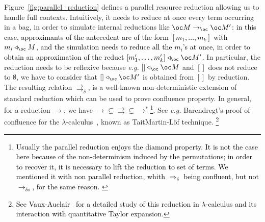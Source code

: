 \documentclass[10pt,a4paper]{article}
\newcommand{\<}{\langle}
\renewcommand{\>}{\rangle}
\newcommand{\todbf}{\to_{\oc}} %
\newcommand{\Todbr}{\Rightarrow_{\delta}} %
\newcommand{\todbrs}{\to_{\delta s}} %
\newcommand{\totodbr}{\rightrightarrows_{\delta}} %
\newcommand{\app}{\triangleleft_\oc} %
\newcommand{\fnl}[1]{\textcolor{black}{#1}}
\newcommand{\nativeemdash}{\ifmmode\text{\textemdash}\else\textemdash\fi}
\begin{document}
Figure~\ref{fig:parallel_reduction} defines a parallel resource reduction allowing us to handle full contexts. Intuitively, it needs to
reduce at once every term occurring in a bag, in order to simulate internal 
reductions like $\oc M\todbf \oc M'$: \fnl{in this case, approximants of the antecedent are of
the form $[m_1,\dots ,m_k]$ with $m_i\app M$, and the simulation needs to reduce all the
$m_i$'s at once, in order to obtain an approximation of the reduct $[m'_1,\dots ,m'_k]\app \oc
M'$.} In particular, the reduction needs to be reflexive
because \emph{e.g.}
$[]\app \oc M$ and $[]$ does not reduce to $\emptyset$, we have to consider that $[]\app
\oc M'$ is obtained from $[]$ by reduction. The resulting relation $\totodbr$, is a
well-known non-deterministic extension of standard reduction which can be used
to prove confluence property. In general, for a reduction $\to$, we have
$\to\subsetneq\rightrightarrows\subsetneq\to^*$\footnote{
	\fnl{Usually the parallel reduction enjoys the diamond property. It is
		not the case here because of the non-determinism induced by
		the permutations; in order to recover it, it is necessary to
		lift the reduction to set of terms. We mentioned it with non parallel
		reduction, whith $\Todbr$ being confluent, but not $\todbrs$,
		for the same reason.
	}
}. See \emph{e.g.} Barendregt's proof of confluence
for the $\lambda$-calculus~\cite{barendregt}, known as Tait\nativeemdash{}Martin-Löf technique.
\footnote{\fnl{See
Vaux-Auclair~\cite{Vaux19} for a detailed study of this reduction in $\lambda$-calculus and its
interaction with quantitative Taylor expansion.}}
%
\end{document}
